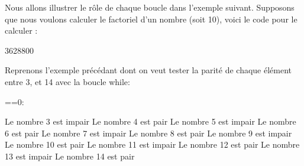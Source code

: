 \documentclass[letterpaper,10pt,french]{sphinxmanual}
\begin{document}
\sphinxAtStartPar
Nous allons illustrer le rôle de chaque boucle dans l’exemple suivant. Supposons que nous voulons calculer le factoriel d’un nombre (soit 10), voici le code pour le calculer :

\begin{sphinxVerbatim}[commandchars=\\\{\}]
  
  
 
      

\end{sphinxVerbatim}

\begin{sphinxVerbatim}[commandchars=\\\{\}]
3628800
\end{sphinxVerbatim}

\sphinxAtStartPar
Reprenons l’exemple précédant dont on veut tester la parité de chaque élément entre 3, et 14 avec la boucle while:

\begin{sphinxVerbatim}[commandchars=\\\{\}]
  
 
     ==0:
          
          
\end{sphinxVerbatim}

\begin{sphinxVerbatim}[commandchars=\\\{\}]
Le nombre 3 est impair
Le nombre 4 est pair
Le nombre 5 est impair
Le nombre 6 est pair
Le nombre 7 est impair
Le nombre 8 est pair
Le nombre 9 est impair
Le nombre 10 est pair
Le nombre 11 est impair
Le nombre 12 est pair
Le nombre 13 est impair
Le nombre 14 est pair
\end{sphinxVerbatim}
\end{document}
